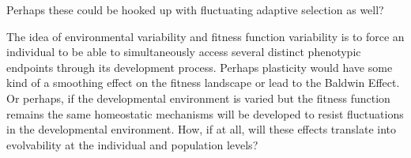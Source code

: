 Perhaps these could be hooked up with fluctuating adaptive selection as well?

The idea of environmental variability and fitness function variability is to force an individual to be able to simultaneously access several distinct phenotypic endpoints through its development process. Perhaps plasticity would have some kind of a smoothing effect on the fitness landscape or lead to the Baldwin Effect. Or perhaps, if the developmental environment is varied but the fitness function remains the same homeostatic mechanisms will be developed to resist fluctuations in the developmental environment. How, if at all, will these effects translate into evolvability at the individual and population levels?